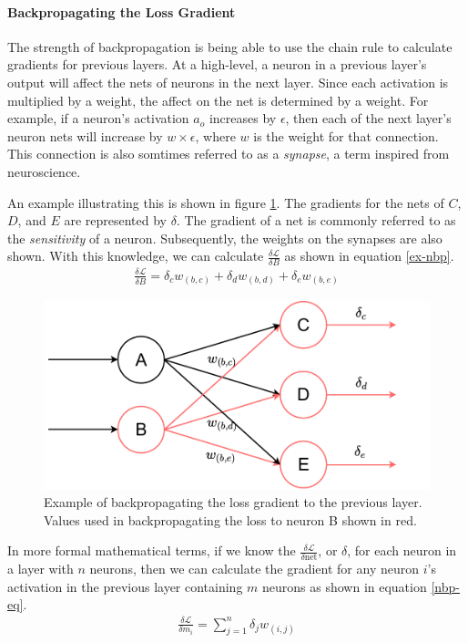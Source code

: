 \paragraph{Backpropagating the Loss Gradient}
The strength of backpropagation is being able to use the chain rule to calculate gradients for previous layers. At a high-level, a neuron in a previous layer's output will affect the nets of neurons in the next layer. Since each activation is multiplied by a weight, the affect on the net is determined by a weight. For example, if a neuron's activation $a_o$ increases by $\epsilon$, then each of the next layer's neuron nets will increase by $w\times \epsilon$, where $w$ is the weight for that connection. This connection is also somtimes referred to as a \textit{synapse}, a term inspired from neuroscience.

An example illustrating this is shown in figure \ref{neuron-bp}. The gradients for the nets of $C$, $D$, and $E$ are represented by $\delta$. The gradient of a net is commonly referred to as the \textit{sensitivity} of a neuron. Subsequently, the weights on the synapses are also shown. With this knowledge, we can calculate $\frac{\delta \mathcal{L}}{\delta B}$ as shown in equation \ref{ex-nbp}.
\begin{align}
\frac{\delta \mathcal{L}}{\delta B} = \delta_cw_{(b,c)} + \delta_dw_{(b,d)} + \delta_ew_{(b,e)} \label{ex-nbp}
\end{align}
\begin{figure}
	\centering 
	\includegraphics[width=\textwidth]{figures/neuron_bp.pdf}
	\caption{Example of backpropagating the loss gradient to the previous layer. Values used in backpropagating the loss to neuron B shown in red.} \label{neuron-bp}
\end{figure}

In more formal mathematical terms, if we know the $\frac{\delta \mathcal{L}}{\delta \text{net}}$, or $\delta$, for each neuron in a layer with $n$ neurons, then we can calculate the gradient for any neuron $i$'s activation in the previous layer containing $m$ neurons as shown in equation \ref{nbp-eq}.
\begin{align}
\frac{\delta \mathcal{L}}{\delta m_i} = \sum_{j=1}^{n} \delta_jw_{(i,j)} \label{nbp-eq}
\end{align}

